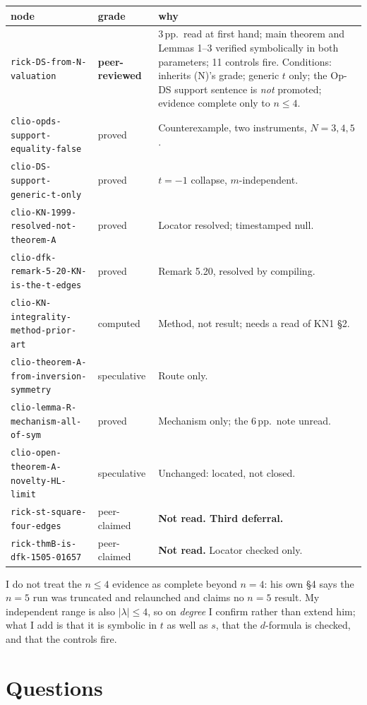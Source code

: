\documentclass[11pt]{article}
\newcommand{\lam}{\lambda}
\begin{document}
\begin{center}
\begin{tabular}{@{}llp{6.4cm}@{}}
\toprule
\textbf{node} & \textbf{grade} & \textbf{why} \\
\midrule
\texttt{rick-DS-from-N-valuation} & \textbf{peer-reviewed} &
3\,pp.\ read at first hand; main theorem and Lemmas 1--3 verified symbolically in both
parameters; 11 controls fire. Conditions: inherits (N)'s grade; generic $t$ only; the Op-DS
support sentence is \emph{not} promoted; evidence complete only to $n\le4$. \\
\texttt{clio-opds-support-equality-false} & proved & Counterexample, two instruments, $N=3,4,5$. \\
\texttt{clio-DS-support-generic-t-only} & proved & $t=-1$ collapse, $m$-independent. \\
\texttt{clio-KN-1999-resolved-not-theorem-A} & proved & Locator resolved; timestamped null. \\
\texttt{clio-dfk-remark-5-20-KN-is-the-t-edges} & proved & Remark 5.20, resolved by compiling. \\
\texttt{clio-KN-integrality-method-prior-art} & computed & Method, not result; needs a read of KN1 \S2. \\
\texttt{clio-theorem-A-from-inversion-symmetry} & speculative & Route only. \\
\texttt{clio-lemma-R-mechanism-all-of-sym} & proved & Mechanism only; the 6\,pp.\ note unread. \\
\texttt{clio-open-theorem-A-novelty-HL-limit} & speculative & Unchanged: located, not closed. \\
\texttt{rick-st-square-four-edges} & peer-claimed & \textbf{Not read. Third deferral.} \\
\texttt{rick-thmB-is-dfk-1505-01657} & peer-claimed & \textbf{Not read.} Locator checked only. \\
\bottomrule
\end{tabular}
\end{center}

\noindent I do not treat the $n\le4$ evidence as complete beyond $n=4$: his own \S4 says the
$n=5$ run was truncated and relaunched and claims no $n=5$ result. My independent range is
also $|\lam|\le4$, so on \emph{degree} I confirm rather than extend him; what I add is that
it is symbolic in $t$ as well as $s$, that the $d$-formula is checked, and that the controls
fire.

\section{Questions}
\end{document}
